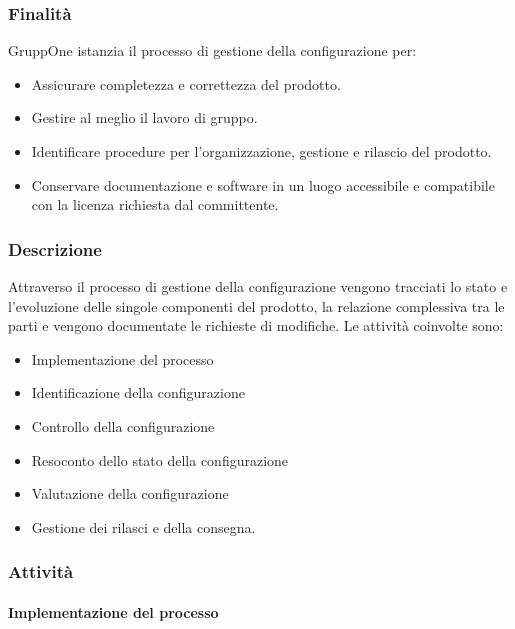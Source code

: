 \documentclass[../../norme-di-progetto.tex]{subfiles}
\begin{document}
\subsubsection{Finalità}%
\label{subs:gestione_della_configurazione/finalita}

GruppOne istanzia il processo di gestione della configurazione per:
\begin{itemize}
  \item Assicurare completezza e correttezza del prodotto.
  \item Gestire al meglio il lavoro di gruppo.
  \item Identificare procedure per l'organizzazione, gestione e rilascio del prodotto.
  \item Conservare documentazione e software in un luogo accessibile e compatibile con la licenza richiesta dal committente.
\end{itemize}

\subsubsection{Descrizione}%
\label{subs:gestione_della_configurazione/descrizione}

Attraverso il processo di gestione della configurazione vengono tracciati lo stato e l'evoluzione delle singole componenti del prodotto, la relazione complessiva tra le parti e vengono documentate le richieste di modifiche.
Le attività coinvolte sono:

\begin{itemize}
  \item Implementazione del processo
  \item Identificazione della configurazione
  \item Controllo della configurazione
  \item Resoconto dello stato della configurazione
  \item Valutazione della configurazione
  \item Gestione dei rilasci e della consegna.
\end{itemize}

\subsubsection{Attività}%
\label{subs:gestione_della_configurazione/attivita}

\paragraph{Implementazione del processo}%
\label{par:gestione_della_configurazione/implementazione_del_processo}
\end{document}
